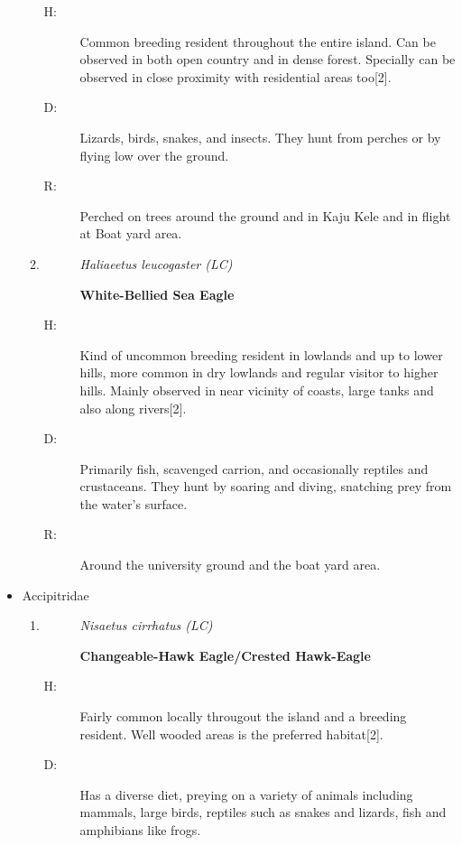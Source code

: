 \begin{itemize}
\begin{enumerate}
\begin{description}
\item[H: ]%
Common breeding resident throughout the entire island. Can be observed in both open country and in dense forest. Specially can be observed in close proximity with residential areas too{[}2{]}.%
\item[D: ]%
 Lizards, birds, snakes, and insects. They hunt from perches or by flying low over the ground.%
\item[R: ]%
Perched on trees around the ground and in Kaju Kele and in flight at Boat yard area.%
\end{description}%
\item%
\begin{description}%
\item[]%
\textit{Haliaeetus leucogaster (LC)}%
\item[]%
\textbf{White{-}Bellied Sea Eagle}%
\end{description}%
\begin{description}%
\item[H: ]%
Kind of uncommon breeding resident in lowlands and up to lower hills, more common in dry lowlands and regular visitor to higher hills. Mainly observed in near vicinity of coasts, large tanks and also along rivers{[}2{]}.%
\item[D: ]%
Primarily fish, scavenged carrion, and occasionally reptiles and crustaceans. They hunt by soaring and diving, snatching prey from the water's surface.%
\item[R: ]%
Around the university ground and the boat yard area.%
\end{description}%
\end{enumerate}%
\item%
Accipitridae%
\begin{enumerate}%
\item%
\begin{description}%
\item[]%
\textit{Nisaetus cirrhatus (LC)}%
\item[]%
\textbf{Changeable{-}Hawk Eagle/Crested Hawk{-}Eagle}%
\end{description}%
\begin{description}%
\item[H: ]%
Fairly common locally througout the island and a breeding resident. Well wooded areas is the preferred habitat{[}2{]}.%
\item[D: ]%
Has a diverse diet, preying on a variety of animals including mammals, large birds, reptiles such as snakes and lizards, fish and amphibians like frogs.%

\end{description}
\end{enumerate}
\end{itemize}
